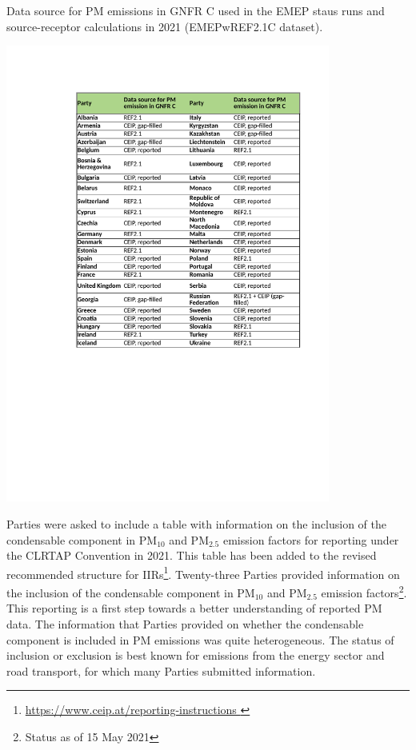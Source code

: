 \begin{table}
  \caption{Data source for PM emissions in GNFR C used in the EMEP staus runs and source-receptor calculations in 2021 (EMEPwREF2.1C dataset).}
\centering
{\includegraphics*[viewport=120 275 550 760,clip,width=0.8\textwidth]{FIGS_CEIP/Table1.pdf}}
\label{tab:CEIP1}  
\end{table}

Parties were asked to include a table with information on the inclusion of the condensable component in PM$_{10}$ and PM$_{2.5}$ emission factors for reporting under the CLRTAP Convention in 2021. This table has been added to the revised
recommended structure for IIRs\footnote{\url{https://www.ceip.at/reporting-instructions } }. Twenty-three Parties provided information on the inclusion of the condensable component in PM$_{10}$ and PM$_{2.5}$ emission factors\footnote{Status as of 15 May 2021}. This reporting is a first step towards a better understanding of reported PM data. The information that Parties provided on whether the condensable component is included in PM emissions was quite heterogeneous. The status of inclusion or exclusion is best known for emissions from the energy sector and road transport, for which many Parties submitted information. 

